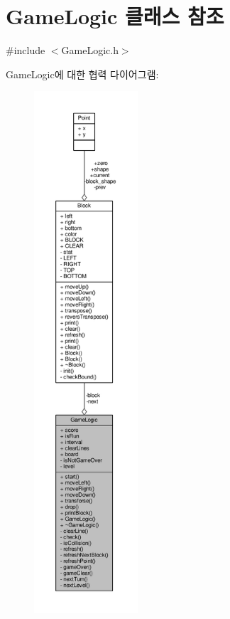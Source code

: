 \hypertarget{class_game_logic}{}\section{Game\+Logic 클래스 참조}
\label{class_game_logic}


{\ttfamily \#include $<$Game\+Logic.\+h$>$}



Game\+Logic에 대한 협력 다이어그램\+:
\nopagebreak
\begin{figure}[H]
\begin{center}
\leavevmode
\includegraphics[height=550pt]{class_game_logic__coll__graph}
\end{center}
\end{figure}

